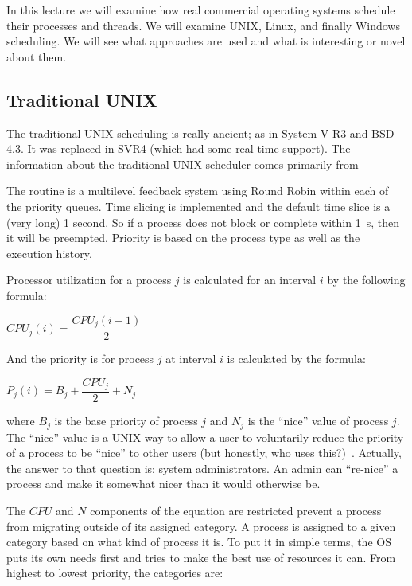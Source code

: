 




In this lecture we will examine how real commercial operating systems schedule their processes and threads. We will examine UNIX, Linux, and finally Windows scheduling. We will see what approaches are used and what is interesting or novel about them.

\subsection*{Traditional UNIX}

The traditional UNIX scheduling is really ancient; as in System V R3 and BSD 4.3. It was replaced in SVR4 (which had some real-time support). The information about the traditional UNIX scheduler comes primarily from~\cite{osi}

The routine is a multilevel feedback system using Round Robin within each of the priority queues. Time slicing is implemented and the default time slice is a (very long) 1 second. So if a process does not block or complete within 1~s, then it will be preempted. Priority is based on the process type as well as the execution history.

Processor utilization for a process $j$ is calculated for an interval $i$ by the following formula:

\begin{center}
$CPU_{j}(i) = \dfrac{CPU_{j}(i - 1)}{2}$
\end{center}

And the priority is for process $j$ at interval $i$ is calculated by the formula:

\begin{center}
$P_{j}(i) = B_{j} + \dfrac{CPU_{j}}{2} + N_{j}$
\end{center}

where $B_{j}$ is the base priority of process $j$ and $N_{j}$ is the ``nice'' value of process $j$. The ``nice'' value is a UNIX way to allow a user to voluntarily reduce the priority of a process to be ``nice'' to other users (but honestly, who uses this?)~\cite{mos}. Actually, the answer to that question is: system administrators. An admin can ``re-nice'' a process and make it somewhat nicer than it would otherwise be.

The $CPU$ and $N$ components of the equation are restricted prevent a process from migrating outside of its assigned category. A process is assigned to a given category based on what kind of process it is. To put it in simple terms, the OS puts its own needs first and tries to make the best use of resources it can. From highest to lowest priority, the categories are:


